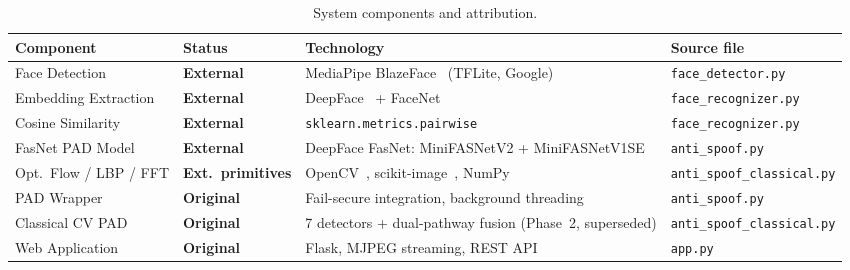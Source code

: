 \documentclass[10pt,a4paper]{article}
\begin{document}
\begin{table}[H]
\centering\small\setlength{\tabcolsep}{4pt}
\caption{System components and attribution.}
\label{tab:components}
\renewcommand{\arraystretch}{1.2}
\begin{tabular}{@{}p{2.6cm}p{2.8cm}p{5.4cm}p{3.4cm}@{}}
\toprule
\textbf{Component} & \textbf{Status} & \textbf{Technology} & \textbf{Source file} \\
\midrule
Face Detection      & \textcolor{codered}{\bfseries External}
  & MediaPipe BlazeFace~\cite{bazarevsky2019blazeface} (TFLite, Google)
  & \texttt{face\_detector.py} \\[2pt]
Embedding Extraction & \textcolor{codered}{\bfseries External}
  & DeepFace~\cite{serengil2021lightface} + FaceNet~\cite{schroff2015facenet}
  & \texttt{face\_recognizer.py} \\[2pt]
Cosine Similarity   & \textcolor{codered}{\bfseries External}
  & \texttt{sklearn.metrics.pairwise}
  & \texttt{face\_recognizer.py} \\[2pt]
FasNet PAD Model    & \textcolor{codered}{\bfseries External}
  & DeepFace FasNet: MiniFASNetV2 + MiniFASNetV1SE~\cite{liu2021minifasnet}
  & \texttt{anti\_spoof.py} \\[2pt]
Opt.\ Flow / LBP / FFT & \textcolor{codered}{\bfseries Ext.\ primitives}
  & OpenCV~\cite{bradski2000opencv}, scikit-image~\cite{ojala2002multiresolution}, NumPy
  & \texttt{anti\_spoof\_classical.py} \\
\midrule
PAD Wrapper         & \textcolor{codegreen}{\bfseries Original}
  & Fail-secure integration, background threading
  & \texttt{anti\_spoof.py} \\[2pt]
Classical CV PAD    & \textcolor{codegreen}{\bfseries Original}
  & 7 detectors + dual-pathway fusion (Phase~2, superseded)
  & \texttt{anti\_spoof\_classical.py} \\[2pt]
Web Application     & \textcolor{codegreen}{\bfseries Original}
  & Flask, MJPEG streaming, REST API
  & \texttt{app.py} \\
\bottomrule
\end{tabular}
\end{table}
\end{document}
